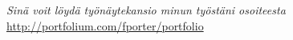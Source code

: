 \documentclass[12pt, oneside]{article}
\newcommand{\headingstyleJobs}[1] {
	{\fontsize{18pt}{1em}\selectfont \textcolor{new_red}{\textsf{#1}}}
	\textcolor{new_red}{\rule{3.25in}{0.5pt}} \vspace{3pt}
}
\newcommand{\jobtitle}[3] {
	{\bf #1} · {#2} · {#3} \vspace{-7pt} \\
}
\begin{document}
\begin{flushleft}






%
%
%


\textit{Sinä voit löydä työnäytekansio minun työstäni osoiteesta} \url{http://portfolium.com/fporter/portfolio}

\end{flushleft}
\end{document}
